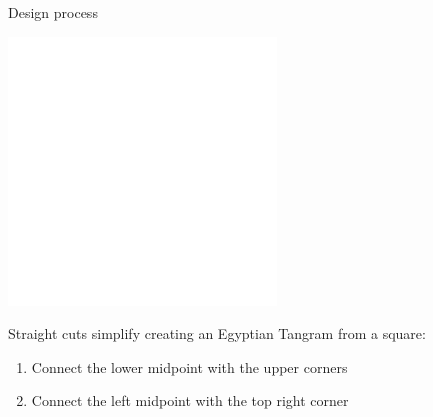 \documentclass[14pt]{beamer}
\begin{document}
    \begin{frame}{Design process}
        \begin{center}
            \includegraphics[height=19ex]{figures/figure001b.pdf}
        \end{center}

        {\small Straight cuts simplify creating an Egyptian Tangram from a square:}

        {\small \begin{enumerate}
            \item Connect the lower midpoint with the upper corners
            \item Connect the left midpoint with the top right corner
        \end{enumerate}}
    \end{frame}

\end{document}
